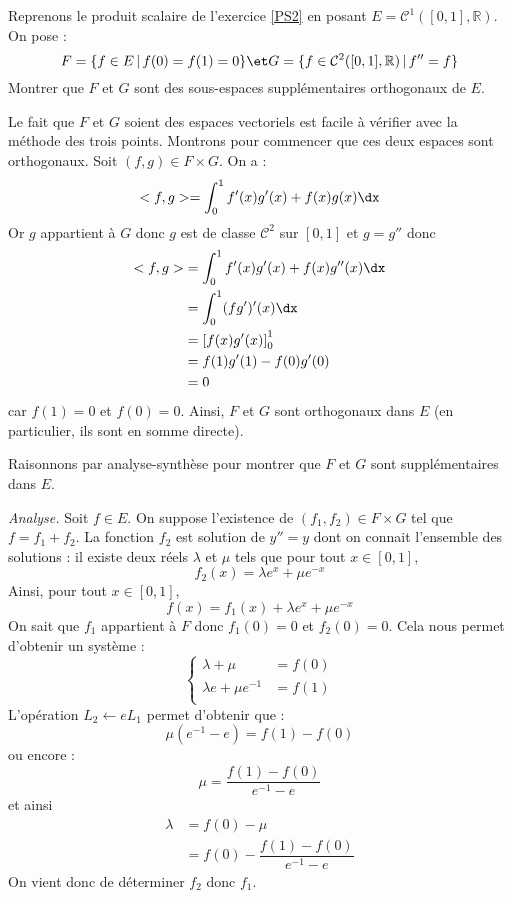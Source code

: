 \documentclass[a4paper,10pt]{report}
\begin{document}
\begin{Exa} Reprenons le produit scalaire de l'exercice \ref{PS2} en posant $E= \mathcal{C}^1([0,1],\mathbb{R})$. On pose :
$$ F = \lbrace f \in E \, \vert \, f(0)=f(1)=0\rbrace \et G= \lbrace f \in \mathcal{C}^2([0,1],\mathbb{R}) \, \vert \, f''=f \rbrace$$
Montrer que $F$ et $G$ sont des sous-espaces supplémentaires orthogonaux  de $E$.
\end{Exa}

\corr Le fait que $F$ et $G$ soient des espaces vectoriels est facile à vérifier avec la méthode des trois points. Montrons pour commencer que ces deux espaces sont orthogonaux. Soit $(f,g) \in F \times G$. On a :
$$<f,g>= \int_{0}^1 f'(x)g'(x)+f(x)g(x) \dx$$
Or $g$ appartient à $G$ donc $g$ est de classe $\mathcal{C}^2$ sur $[0,1]$ et $g=g''$ donc 
\begin{align*}
 <f,g> & = \int_{0}^1 f'(x)g'(x)+f(x)g''(x) \dx \\
 & = \int_{0}^1 (fg')'(x) \dx \\
 &= \left[ f(x)g'(x) \right]_0^1 \\
 & = f(1)g'(1)-f(0)g'(0) \\
 & = 0
 \end{align*}
 car $f(1)=0$ et $f(0)=0$. Ainsi, $F$ et $G$ sont orthogonaux dans $E$ (en particulier, ils sont en somme directe).
 
 \medskip
 
 \noindent Raisonnons par analyse-synthèse pour montrer que $F$ et $G$ sont supplémentaires dans $E$.
 
 \medskip
 
 \noindent \textit{Analyse.} Soit $f \in E$. On suppose l'existence de $(f_1,f_2) \in F \times G$ tel que $f=f_1+f_2$. La fonction $f_2$ est solution de $y''=y$ dont on connait l'ensemble des solutions : il existe deux réels $\lambda$ et $\mu$ tels que pour tout $x \in [0,1]$,
 $$ f_2(x) = \lambda e^x + \mu e^{-x}$$
 Ainsi, pour tout $x \in [0,1]$,
 $$ f(x)= f_1(x) + \lambda e^x + \mu e^{-x}$$
 On sait que $f_1$ appartient à $F$ donc $f_1(0)=0$ et $f_2(0) =0$. Cela nous permet d'obtenir un système :
 $$ \left\lbrace \begin{array}{rl}
 \lambda + \mu & = f(0) \\
 \lambda e+ \mu e^{-1} & = f(1) \\
 \end{array}\right.$$
 L'opération $L_2 \leftarrow e L_1$ permet d'obtenir que :
 $$ \mu (e^{-1}-e) = f(1)-f(0)$$
 ou encore :
 $$ \mu = \dfrac{f(1)-f(0)}{e^{-1}-e}$$
 et ainsi
 \begin{align*}
 \lambda & = f(0)- \mu \\
 & = f(0) - \dfrac{f(1)-f(0)}{e^{-1}-e} 
 \end{align*}
 On vient donc de déterminer $f_2$ donc $f_1$.
 \medskip
 
\end{document}
